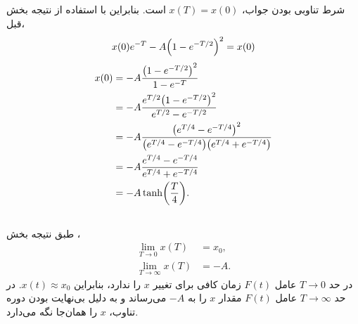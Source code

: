 \documentclass[12pt,a4paper]{article}
\begin{document}
	\subsection{}
	شرط تناوبی بودن جواب، $x(T) = x(0)$ است. بنابراین با استفاده از نتیجه بخش قبل،
	\begin{equation}
		x(0)e^{-T} - A\qty(1 - e^{-T/2})^2 = x(0)
	\end{equation}
	\begin{align}
		x(0) &= -A\frac{\qty(1 - e^{-T/2})^2}{1-e^{-T}} \\
		&= -A\frac{e^{T/2}\qty(1 - e^{-T/2})^2}{e^{T/2}-e^{-T/2}} \\
		&= -A\frac{\qty(e^{T/4} - e^{-T/4})^2}{\qty(e^{T/4}-e^{-T/4})\qty(e^{T/4}+e^{-T/4})} \\
		&= -A\frac{e^{T/4} - e^{-T/4}}{e^{T/4}+e^{-T/4}} \\
		&= -A\tanh(\frac{T}{4}).
	\end{align}
	\subsection{}
	طبق نتیجه بخش ،
	\begin{align}
		\lim_{T\to0}x(T) &= x_0, \\
		\lim_{T\to\infty}x(T) &= -A.
	\end{align}
	در حد $T\to0 $ عامل $F(t)$ زمان کافی برای تغییر $x$ را ندارد، بنابراین $x(t)\approx x_0 $.
	در حد $T\to\infty$ عامل $F(t)$ مقدار $x$ را به $-A$ می‌رساند و به دلیل بی‌نهایت بودن دوره تناوب، $x$ را همان‌جا
	نگه می‌دارد.
\end{document}
